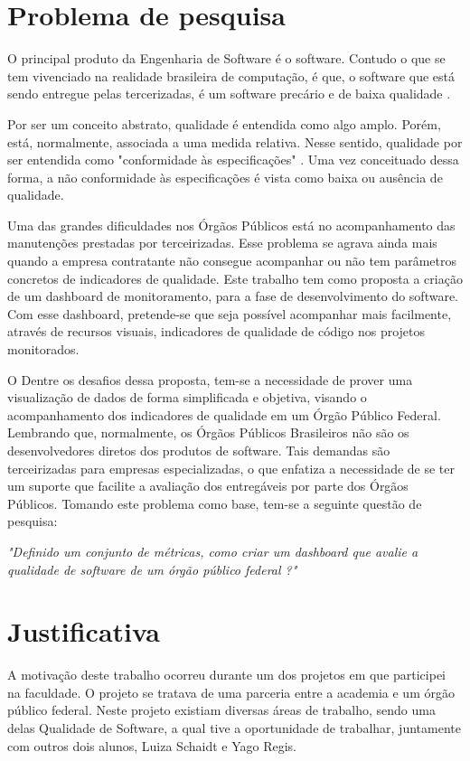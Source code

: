 \section{Problema de pesquisa}
O principal produto da Engenharia de Software é o software. Contudo o que se tem vivenciado na realidade brasileira de computação, é que, o software que está sendo entregue pelas tercerizadas, é um software precário e de baixa qualidade \cite{schnaider_uma_2004}.

Por ser um conceito abstrato, qualidade é entendida como algo amplo. Porém, está, normalmente, associada a uma medida relativa. Nesse sentido, qualidade por ser entendida como "conformidade às especificações" \cite{crosby}. Uma vez conceituado dessa forma, a não conformidade às especificações é vista como baixa ou ausência de qualidade.

Uma das grandes dificuldades nos Órgãos Públicos está no acompanhamento das manutenções prestadas por terceirizadas. Esse problema se agrava ainda mais quando a empresa contratante não consegue acompanhar ou não tem parâmetros concretos de indicadores de qualidade.
Este trabalho tem como proposta a criação de um dashboard de monitoramento, para a fase de desenvolvimento do software. Com esse dashboard, pretende-se que seja possível acompanhar mais facilmente, através de recursos visuais, indicadores de qualidade de código nos projetos monitorados.

O Dentre os desafios dessa proposta, tem-se a necessidade de prover uma visualização de dados de forma simplificada e objetiva, visando o acompanhamento dos indicadores de qualidade em um Órgão Público Federal.  Lembrando que, normalmente, os Órgãos Públicos Brasileiros não são os desenvolvedores diretos dos produtos de software. Tais demandas são terceirizadas para empresas especializadas, o que enfatiza a necessidade de se ter um suporte que facilite a avaliação dos entregáveis por parte dos Órgãos Públicos. Tomando este problema como base, tem-se a seguinte questão de pesquisa:
	
	\begin{center}
	\textit{"Definido um conjunto de métricas, como criar um dashboard que avalie a qualidade de software de um órgão público federal ?"}	
	\end{center}

\section{Justificativa}
	A motivação deste trabalho ocorreu durante um dos projetos em que participei na faculdade.  O projeto se tratava de uma parceria entre a academia e um órgão público federal. Neste projeto existiam diversas áreas de trabalho, sendo uma delas Qualidade de Software, a qual tive a oportunidade de trabalhar, juntamente com outros dois alunos, Luiza Schaidt e Yago Regis.
	
